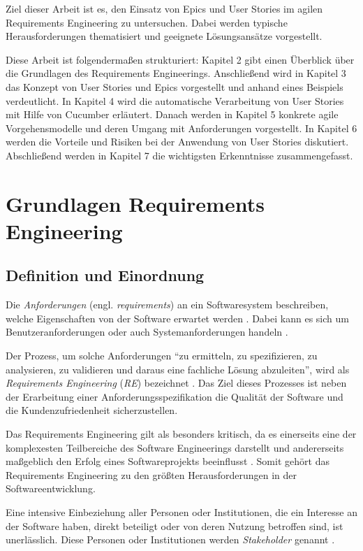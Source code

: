 \documentclass[acmtog]{acmart}
\begin{document}
Ziel dieser Arbeit ist es, den Einsatz von Epics und User Stories im agilen Requirements Engineering zu untersuchen. Dabei werden typische Herausforderungen thematisiert und geeignete Lösungsansätze vorgestellt.

Diese Arbeit ist folgendermaßen strukturiert:
Kapitel 2 gibt einen Überblick über die Grundlagen des Requirements Engineerings.
Anschließend wird in Kapitel 3 das Konzept von User Stories und Epics vorgestellt und anhand eines Beispiels verdeutlicht.
In Kapitel 4 wird die automatische Verarbeitung von User Stories mit Hilfe von Cucumber erläutert.
Danach werden in Kapitel 5 konkrete agile Vorgehensmodelle und deren Umgang mit Anforderungen vorgestellt.
In Kapitel 6 werden die Vorteile und Risiken bei der Anwendung von User Stories diskutiert.
Abschließend werden in Kapitel 7 die wichtigsten Erkenntnisse zusammengefasst.

\section{Grundlagen Requirements Engineering}

\subsection{Definition und Einordnung}
Die \emph{Anforderungen} (engl. \textit{requirements}) an ein Softwaresystem beschreiben, welche Eigenschaften von der Software erwartet werden \cite{sommerville16}. Dabei kann es sich um Benutzeranforderungen oder auch Systemanforderungen handeln \cite{sommerville16}.

Der Prozess, um solche Anforderungen ``zu ermitteln, zu spezifizieren, zu analysieren, zu validieren und daraus eine fachliche Lösung abzuleiten'', wird als \emph{Requirements Engineering} (\emph{RE}) bezeichnet \cite{balzert09}.
Das Ziel dieses Prozesses ist neben der Erarbeitung einer Anforderungsspezifikation die Qualität der Software und die Kundenzufriedenheit sicherzustellen.

Das Requirements Engineering gilt als besonders kritisch, da es einerseits eine der komplexesten Teilbereiche des Software Engineerings darstellt und andererseits maßgeblich den Erfolg eines Softwareprojekts beeinflusst \cite{balzert09}.
Somit gehört das Requirements Engineering zu den größten Herausforderungen in der Softwareentwicklung.

Eine intensive Einbeziehung aller Personen oder Institutionen, die ein Interesse an der Software haben, direkt beteiligt oder von deren Nutzung betroffen sind, ist unerlässlich. Diese Personen oder Institutionen werden \emph{Stakeholder} genannt \cite{balzert09}.
\end{document}
